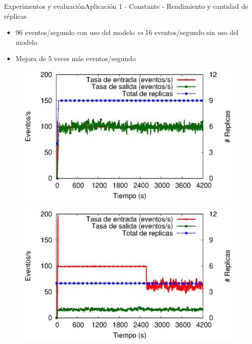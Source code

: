 \begin{frame}{Experimentos y evaluación}{Aplicación 1 - Constante - Rendimiento y cantidad de réplicas}

\begin{itemize}
\item 96 eventos/segundo con uso del modelo \textit{vs} 16 eventos/segundo sin uso del modelo
\item Mejora de 5 veces más eventos/segundo
\end{itemize}

\begin{multicols}{2}
\begin{figure}[p]
	\centering
	\includegraphics[scale=0.4]{images/exp/app1/uniform/cm/processSystem.eps}
\end{figure}

\begin{figure}[p]
	\centering
	\includegraphics[scale=0.4]{images/exp/app1/uniform/sm/processSystem.eps}
\end{figure}
\end{multicols}
\end{frame}

